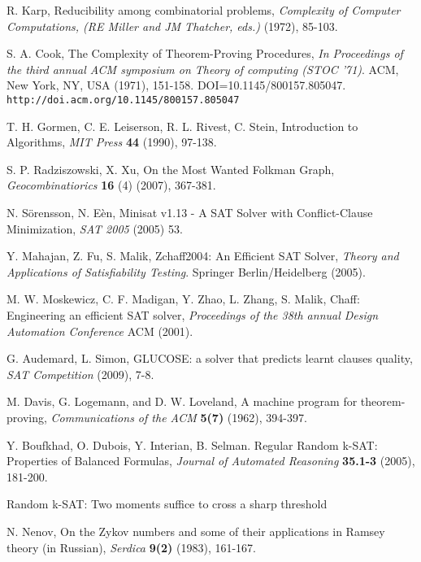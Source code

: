 \documentclass[paper=a4, fontsize=11pt]{scrartcl} %
\begin{document}


\begin{thebibliography}{9}

 R. Karp, Reducibility among combinatorial problems, \emph{Complexity of Computer Computations, (RE Miller and JM Thatcher, eds.)} (1972), 85-103.

 S. A. Cook, The Complexity of Theorem-Proving Procedures, \emph{In Proceedings of the third annual ACM symposium on Theory of computing (STOC '71)}. ACM, New York, NY, USA (1971), 151-158. DOI=10.1145/800157.805047. {\tt http://doi.acm.org/10.1145/800157.805047}

 T. H. Gormen, C. E. Leiserson, R. L. Rivest, C. Stein, Introduction to Algorithms, \emph{MIT Press} \textbf{44} (1990), 97-138.

 S. P. Radziszowski, X. Xu, On the Most Wanted Folkman Graph, \emph{Geocombinatiorics} \textbf{16} (4) (2007), 367-381.

 N. S\"{o}rensson, N. E\`{e}n, Minisat v1.13 - A SAT Solver with Conflict-Clause Minimization, \emph{SAT 2005} (2005) 53.

 Y. Mahajan, Z. Fu, S. Malik, Zchaff2004: An Efficient SAT Solver, \emph{Theory and Applications of Satisfiability Testing}. Springer Berlin/Heidelberg (2005).

 M. W. Moskewicz, C. F. Madigan, Y. Zhao, L. Zhang, S. Malik, Chaff: Engineering an efficient SAT solver, \emph{Proceedings of the 38th annual Design Automation Conference} ACM (2001).

 G. Audemard, L. Simon, GLUCOSE: a solver that predicts learnt clauses quality, \emph{SAT Competition} (2009), 7-8.

 M. Davis, G. Logemann, and D. W. Loveland, A machine program for theorem-proving, \emph{Communications of the ACM} \textbf{5(7)} (1962), 394-397.

 Y. Boufkhad, O. Dubois, Y. Interian, B. Selman. Regular Random k-SAT: Properties of Balanced Formulas, \emph{Journal of Automated Reasoning} \textbf{35.1-3} (2005), 181-200.

 Random k-SAT: Two moments suffice to cross a sharp threshold

 N. Nenov, On the Zykov numbers and some of their applications in Ramsey theory (in Russian), \emph{Serdica} \textbf{9(2)} (1983), 161-167.

\end{thebibliography}
\end{document}
